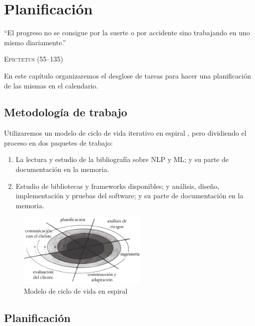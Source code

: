 
\chapter{Planificación}

\epigraph{``El progreso no se consigue por la suerte o por accidente sino trabajando en uno mismo diariamente.''}{\textsc{Epictetus} (55--135)}

En este capítulo organizaremos el desglose de tareas para hacer una planificación de las mismas en el calendario.

\section{Metodología de trabajo}

Utilizaremos un modelo de ciclo de vida iterativo en espiral \citep{Boehm1988}, pero dividiendo el proceso en dos paquetes de trabajo:
\begin{enumerate}[WP1]
\item La lectura y estudio de la bibliografía sobre NLP y ML; y su parte de documentación en la memoria.
\item Estudio de bibliotecas y frameworks disponibles; y análisis, diseño, implementación y pruebas del software; y su parte de documentación en la memoria.
\end{enumerate}

\begin{figure}[htbp]
\centering
\includegraphics[width=0.55\textwidth]{espiral}
\caption[Modelo de ciclo de vida en espiral]{Modelo de ciclo de vida en espiral \citep{Boehm1988}}
\label{fig:espiral}
\end{figure}


\section{Planificación}

